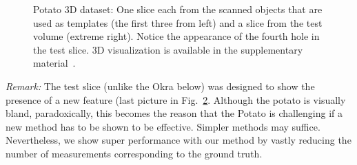 \documentclass[journal]{IEEEtran}
\begin{document}
\begin{figure}[!h]
\begin{subfigure}[b]{0.24\linewidth}
\captionsetup{labelformat=empty}
        \caption{}
     \end{subfigure}
    \begin{subfigure}[b]{0.235\linewidth}
\captionsetup{labelformat=empty}
\caption{}
\label{fig:potato3D_test}
     \end{subfigure}
      \caption{Potato 3D dataset: One slice each from the scanned
        objects that are used as templates (the first three from
        left) and a slice from the test volume (extreme right). Notice
        the appearance of the fourth hole in the test slice. 3D visualization is available
      in the supplementary material~\cite{supp_paper}.}
\label{fig:potato_dataset}
\end{figure}

\textit{Remark:} The test slice (unlike the Okra below) was designed
to show the presence of a new feature (last picture in
Fig.~\ref{fig:potato_dataset}. Although the potato is visually bland,
paradoxically, this becomes the reason that the Potato is challenging
if a new method has to be shown to be effective.  Simpler methods may
suffice.  Nevertheless, we show super performance with our method by
vastly reducing the number of measurements corresponding to the ground truth.
\end{document}
